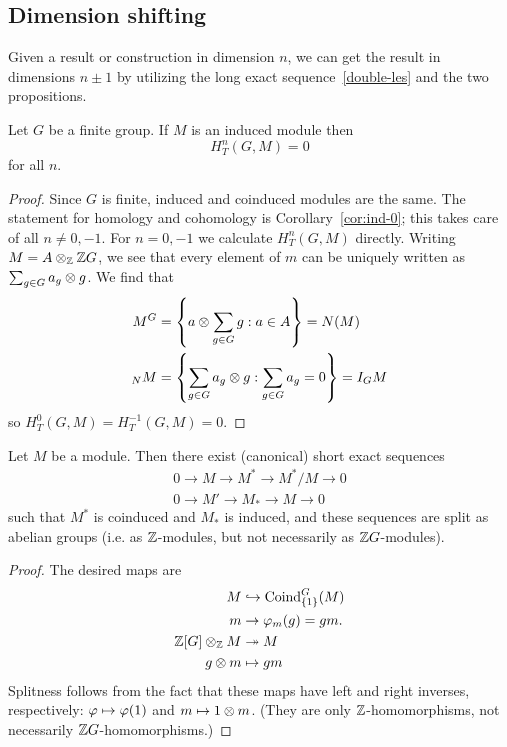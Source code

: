 \subsection{Dimension shifting}
Given a result or construction in dimension $n$, we can get the result in dimensions $n\pm 1$ by utilizing the long exact sequence~\ref{double-les} and the two propositions.
\begin{pr}
Let $G$ be a finite group. If $M$ is an induced module then
\[
H_T^n(G,M)=0
\]
for all $n$.
\end{pr}
\begin{proof}
Since $G$ is finite, induced and coinduced modules are the same. The statement for homology and cohomology is Corollary~\ref{cor:ind-0}; this takes care of all $n\ne 0,-1$. For $n=0,-1$ we calculate $H_T^n(G,M)$ directly. Writing $M=A\otimes_{\mathbb{Z}}\mathbb{Z} G$, we see that every element of $m$ can be uniquely written as $\sum_{g\in G} a_g\otimes g$. We find that
\begin{align*}
M^G&=\left\{{a\otimes\sum_{g\in G} g}:{a\in A}\right\}=N(M)\\
{}_NM&=\left\{{\sum_{g\in G} a_g\otimes g}:{\sum_{g\in G}a_g=0}\right\}=I_GM
\end{align*}
so $H_T^0(G,M)=H_T^{-1}(G,M)=0$.
\end{proof}
\begin{pr}
Let $M$ be a module. Then there exist (canonical) short exact sequences
\begin{gather*}
0\to M\to M^* \to M^*/M\to 0\\
0\to M'\to M_* \to M\to 0
\end{gather*}
such that $M^*$ is coinduced and $M_*$ is induced, and these sequences are split as abelian groups (i.e. as $\mathbb{Z}$-modules, but not necessarily as $\mathbb{Z} G$-modules).
\end{pr}
\begin{proof}
The desired maps are
\begin{align*}
M &\hookrightarrow \operatorname{Coind}_{\{1\}}^G(M)\\
m&\to \varphi_m(g)=gm.\\
\mathbb{Z}[G]\otimes_{\mathbb{Z}} M&\twoheadrightarrow M\\
g\otimes m&\mapsto gm
\end{align*}
Splitness follows from the fact that these maps have left and right inverses, respectively: $\varphi\mapsto \varphi(1)$ and $m\mapsto 1\otimes m$. (They are only $\mathbb{Z}$-homomorphisms, not necessarily $\mathbb{Z} G$-homomorphisms.)
\end{proof}

